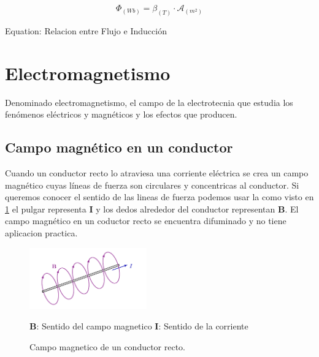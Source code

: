 \documentclass{report}
\begin{document}
\begin{center}
  \label{eq:Relacion entre Flujo e Inducción}
  \[\Phi_{(Wb)} = \beta_{\mathit{(T)}} \cdot \mathcal{A}_{(m^2)}\]

Equation: Relacion entre Flujo e Inducción
\end{center}
\vspace{1em}
  \section{Electromagnetismo }\label{sec:electromagnetismo}

Denominado electromagnetismo, el campo de la electrotecnia que estudia los fenómenos eléctricos y magnéticos
y los efectos que producen.

  \subsection{Campo magnético en un conductor } \label{ssec:campo_magnetico_conductor}
Cuando un conductor recto lo atraviesa una corriente eléctrica se crea un campo magnético cuyas líneas de fuerza son circulares y concentricas al conductor. 
Si queremos conocer el sentido de las lineas de fuerza podemos usar la  como visto en \ref{fig:Campo Magnetico de un conductor recto}
el pulgar representa \(\mathbf{I}\) y los dedos alrededor del conductor representan \(\mathbf{B}\).
El campo magnético en un coductor recto se encuentra difuminado y no tiene aplicacion practica.
\begin{figure}[h]
  \centering
  \caption{Campo magnetico de un conductor recto.}
  \label{fig:Campo Magnetico de un conductor recto}
  \vspace{.5em}
  \includegraphics[width=0.45\textwidth]{magnetic_field_wire.pdf}
  \vspace{.5em}
  \begin{center}
    \(\mathbf{B}\): Sentido del campo magnetico  \(\mathbf{I}\): Sentido de la corriente
  \end{center}
\end{figure}
\end{document}
